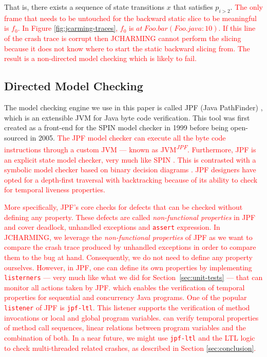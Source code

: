 \documentclass[times, doublespace]{smrauth}
\newcommand{\red}[1]{\textcolor{red}{#1}}
\begin{document}
{That is, there exists a sequence of state transitions $x$ that
satisfies $p_{i>2}$. \red{The only frame that
needs to be untouched for the backward static slice to be
meaningful is $f_0$. In Figure \ref{fig:jcarming-traces}, $f_0$ is $at~ Foo.bar(Foo.java:10)$.
If this line of the crash trace is corrupt then JCHARMING cannot perform the slicing because it does not know where to start the static backward slicing from.
The result is a non-directed model checking which is likely to fail.}

\subsection{Directed Model Checking}

The model checking engine we use in this paper is called JPF
(Java PathFinder) \cite{Visser2004}, which is an extensible JVM for Java
byte code verification. This tool was first created as a front-end
for the SPIN model checker \cite{holzmann1997model} in 1999 before being
open-sourced in 2005.
\red{The JPF model checker can execute all the byte code instructions through a custom JVM --- known as JVM\textsuperscript{\textit{JPF}}. Furthermore, JPF is an explicit state model checker,
very much like SPIN \cite{holzmann1997model}. This is contrasted with a symbolic model
checker based on binary decision diagrams \cite{mcmillan1993symbolic}.
JPF designers have opted for a depth-first traversal with backtracking  because of its ability to check for temporal liveness properties.}

\red{More specifically, JPF's core checks for defects that can be checked without defining any property.
These defects are called \textit{non-functional properties} in JPF and cover deadlock, unhandled exceptions and \texttt{assert} expression.
In JCHARMING, we leverage the \textit{non-functional properties} of JPF as we want to compare the crash trace produced by unhandled exceptions in order to compare them to the bug at hand.
Consequently, we do not need to define any property ourselves.
However, in JPF, one can define its own properties by implementing \texttt{listerners} --- very much like what we did for Section~\ref{sec:unit-tests} --- that can monitor all actions taken by JPF. which enables the verification of temporal properties for sequential and concurrency Java programs.
One of the popular \texttt{listener} of JPF is \texttt{jpf-ltl}.
This listener supports the verification of method invocations or local and global program variables. \textttt{jpf-ltl} can verify temporal properties of method call sequences, linear relations between program variables and the combination of both.
In a near future, we might use \texttt{jpf-ltl} and the LTL logic to check multi-threaded related crashes, as described in Section \ref{sec:conclusion}.}

}
\end{document}
